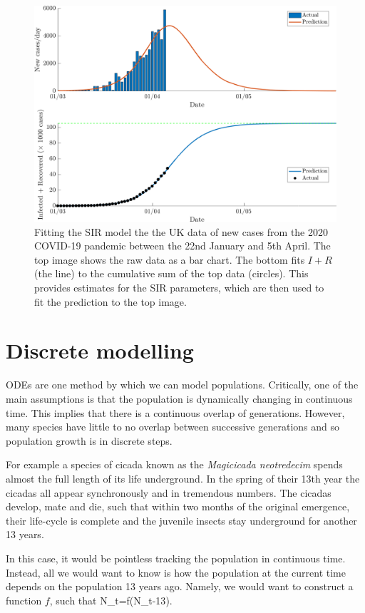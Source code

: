 \begin{figure}[h!!!tb]
\centering
\includegraphics[width=\textwidth]{../Pictures/Covid.png}
\caption{Fitting the SIR model the the UK data of new cases from the 2020 COVID-19 pandemic between the 22nd January and 5th April. The top image shows the raw data as a bar chart. The bottom fits $I+R$ (the line) to the cumulative sum of the top data (circles). This provides estimates for the SIR parameters, which are then used to fit the prediction to the top image.\label{Covid}}
\end{figure}




\section{Discrete modelling}
ODEs are one method by which we can model populations. Critically, one of the main assumptions is that the population is dynamically changing in continuous time. This implies that there is a continuous overlap of generations. However, many species have little to no overlap between successive generations and so population growth is in discrete steps. 

For example a species of cicada known as the \textit{Magicicada neotredecim} spends almost the full length of its life underground. In the spring of their 13th year the cicadas all appear synchronously and in tremendous numbers. The cicadas develop, mate and die, such that within two months of the original emergence, their life-cycle is complete and the juvenile insects stay underground for another 13 years.

In this case, it would be pointless tracking the population in continuous time. Instead, all we would want to know is how the population at the current time depends on the population 13 years ago. Namely, we would want to construct a function $f$, such that
\bb
N_t=f(N_{t-13}).
\ee

